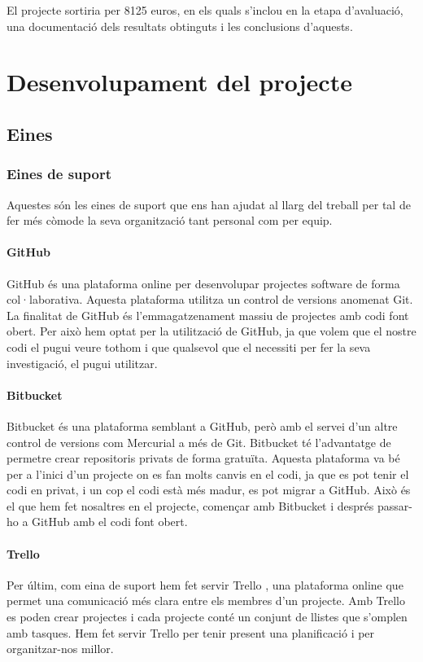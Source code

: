 \documentclass[12pt,a4paper,catalan]{article}
\begin{document}
El projecte sortiria per 8125 euros, en els quals s'inclou en la etapa d'avaluació, una documentació dels resultats obtinguts i les conclusions d'aquests.

\newpage

\section{Desenvolupament del projecte}
\subsection{Eines}
\subsubsection{Eines de suport}
Aquestes són les eines de suport que ens han ajudat al llarg del treball per tal de fer més còmode la seva organització tant personal com per equip.

\paragraph{GitHub}
GitHub \cite{github} és una plataforma online per desenvolupar projectes software de forma col·laborativa. Aquesta plataforma utilitza un control de versions anomenat Git. La finalitat de GitHub és l'emmagatzenament massiu de projectes amb codi font obert. Per això hem optat per la utilització de GitHub, ja que volem que el nostre codi el pugui veure tothom i que qualsevol que el necessiti per fer la seva investigació, el pugui utilitzar.

\paragraph{Bitbucket}
Bitbucket \cite{bitbucket} és una plataforma semblant a GitHub, però amb el servei d'un altre control de versions com Mercurial a més de Git. Bitbucket té l'advantatge de permetre crear repositoris privats de forma gratuïta. Aquesta plataforma va bé per a l'inici d'un projecte on es fan molts canvis en el codi, ja que es pot tenir el codi en privat, i un cop el codi està més madur, es pot migrar a GitHub. Això és el que hem fet nosaltres en el projecte, començar amb Bitbucket i després passar-ho a GitHub amb el codi font obert.

\paragraph{Trello}
Per últim, com eina de suport hem fet servir Trello \cite{trello}, una plataforma online que permet una comunicació més clara entre els membres d'un projecte. Amb Trello es poden crear projectes i cada projecte conté un conjunt de llistes que s'omplen amb tasques. Hem fet servir Trello per tenir present una planificació i per organitzar-nos millor.
\end{document}
